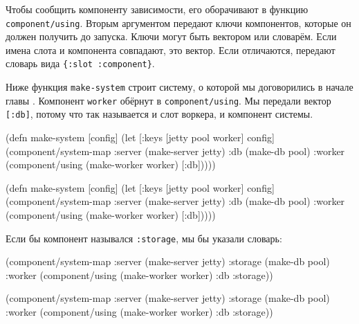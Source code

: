 Чтобы сообщить компоненту зависимости, его оборачивают в функцию
\verb|component/using|. Вторым аргументом передают ключи компонентов, которые он
должен получить до запуска. Ключи могут быть вектором или словарём. Если имена
слота и компонента совпадают, это вектор. Если отличаются, передают словарь вида
\verb|{:slot :component}|.

Ниже функция \verb|make-system| строит систему, о которой мы договорились в
начале главы . Компонент \verb|worker| обёрнут в
\verb|component/using|. Мы передали вектор \verb|[:db]|, потому что так
называется и слот воркера, и компонент системы.

\ifnarrow

\begin{english}
  \begin{clojure}
(defn make-system
  [config]
  (let [{:keys [jetty pool worker]}
        config]
    (component/system-map
     :server (make-server jetty)
     :db     (make-db pool)
     :worker (component/using
               (make-worker worker)
               [:db]))))
  \end{clojure}
\end{english}

\else

\begin{english}
  \begin{clojure}
(defn make-system
  [config]
  (let [{:keys [jetty pool worker]} config]
    (component/system-map
     :server (make-server jetty)
     :db     (make-db pool)
     :worker (component/using
              (make-worker worker) [:db]))))
  \end{clojure}
\end{english}

\fi


\noindent
Если бы компонент назывался \verb|:storage|, мы бы указали словарь:

\ifnarrow

\begin{english}
  \begin{clojure}
(component/system-map
 :server  (make-server jetty)
 :storage (make-db pool)
 :worker  (component/using
            (make-worker worker)
            {:db :storage}))
  \end{clojure}
\end{english}

\else

\begin{english}
  \begin{clojure}
(component/system-map
 :server  (make-server jetty)
 :storage (make-db pool)
 :worker  (component/using
           (make-worker worker) {:db :storage}))
  \end{clojure}
\end{english}

